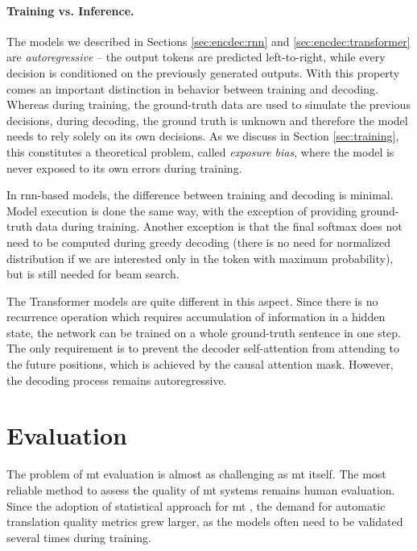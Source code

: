 \paragraph{Training vs. Inference.}
The models we described in Sections \ref{sec:encdec:rnn} and
\ref{sec:encdec:transformer} are \emph{autoregressive} -- the output tokens are
predicted left-to-right, while every decision is conditioned on the previously
generated outputs. With this property comes an important distinction in
behavior between training and decoding. Whereas during training, the
ground-truth data are used to simulate the previous decisions, during decoding,
the ground truth is unknown and therefore the model needs to rely solely on its
own decisions. As we discuss in Section \ref{sec:training}, this constitutes a
theoretical problem, called \emph{exposure bias}, where the model is never
exposed to its own errors during training.

In \acs{rnn}-based models, the difference between training and decoding is
minimal. Model execution is done the same way, with the exception of providing
ground-truth data during training. Another exception is that the final softmax
does not need to be computed during greedy decoding (there is no need for
normalized distribution if we are interested only in the token with maximum
probability), but is still needed for beam search.

The Transformer models are quite different in this aspect. Since there is no
recurrence operation which requires accumulation of information in a hidden
state, the network can be trained on a whole ground-truth sentence in one step.
The only requirement is to prevent the decoder self-attention from attending to
the future positions, which is achieved by the causal attention mask. However,
the decoding process remains autoregressive.


\section{Evaluation}
\label{sec:evaluation}

The problem of \ac{mt} evaluation is almost as challenging as \ac{mt} itself.
The most reliable method to assess the quality of \ac{mt} systems remains human
evaluation.  Since the adoption of statistical approach for \ac{mt}
\citep{brown-etal-1993-mathematics,koehn-etal-2003-statistical}, the demand for
automatic translation quality metrics grew larger, as the models often need to
be validated several times during training.

